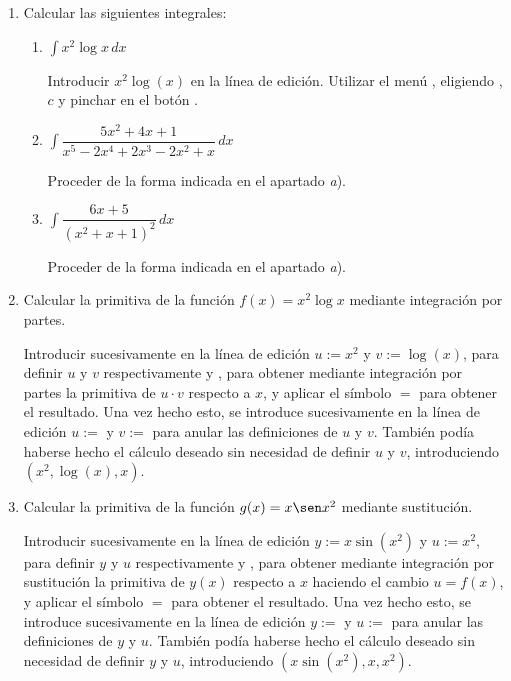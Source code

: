 \begin{enumerate}[leftmargin=*]
\item Calcular las siguientes integrales:

\begin{enumerate}
\item $ \int{x^{2} \log{x}\,dx}$

\begin{indicacion}
{Introducir $x^{2}\log(x)$ en la línea de edición. Utilizar el menú
, eligiendo ,
 $c$ y pinchar en el botón . }
\end{indicacion}

\item $ \int{\dfrac{5x^{2}+4x+1}{x^{5}-2x^{4}+2x^{3}-2x^{2}+x}\,dx}$
\begin{indicacion}
{Proceder de la forma indicada en el apartado \emph{a}). }
\end{indicacion}

\item $ \int{\dfrac{6x+5}{(x^{2}+x+1)^{2}}\,dx}$
\begin{indicacion}
{Proceder de la forma indicada en el apartado \emph{a}). }
\end{indicacion}
\end{enumerate}

\item Calcular la primitiva de la función $f(x)=x^{2}\log x$ mediante integración por partes.
\begin{indicacion}
{Introducir sucesivamente en la línea de edición $u:=x^{2}$ y
$v:=\log(x)$, para definir $u$ y $v$ respectivamente y
, para obtener mediante integración por
partes la primitiva de $u \cdot v$ respecto a $x$, y aplicar el
símbolo $=$ para obtener el resultado. Una vez hecho esto, se
introduce sucesivamente en la línea de edición $u:=$ y $v:=$ para
anular las definiciones de $u$ y $v$. También podía haberse hecho el
cálculo deseado sin necesidad de definir $u$ y $v$, introduciendo
$(x^2,\log(x),x)$. }
\end{indicacion}

\item Calcular la primitiva de la función $g(x)=x\sen x^2$ mediante sustitución.
\begin{indicacion}
{ Introducir sucesivamente en la línea de edición $y:=x\sin(x^{2})$
y $u:=x^{2}$, para definir $y$ y $u$ respectivamente y
, para obtener mediante integración por
sustitución la primitiva de $y(x)$ respecto a $x$ haciendo el cambio
$u=f(x)$, y aplicar el símbolo $=$ para obtener el resultado. Una
vez hecho esto, se introduce sucesivamente en la línea de edición
$y:=$ y $u:=$ para anular las definiciones de $y$ y $u$. También
podía haberse hecho el cálculo deseado sin necesidad de definir $y$
y $u$, introduciendo $(x \sin(x^{2}),x,x^2)$. }
\end{indicacion}
\end{enumerate}

